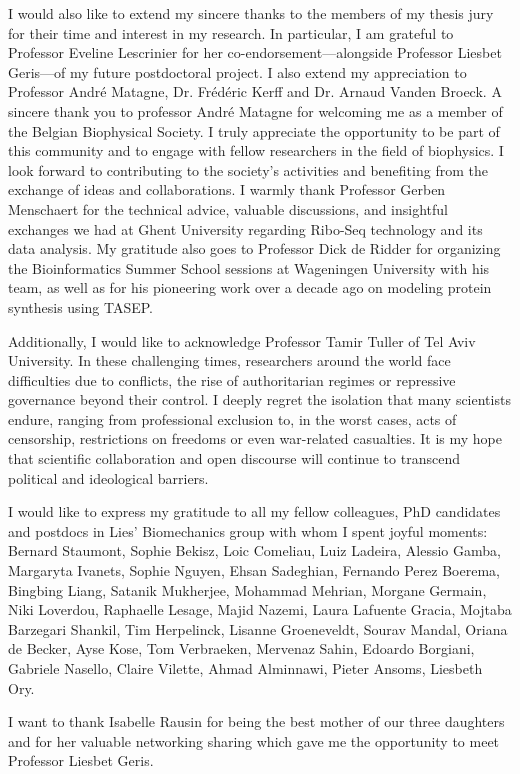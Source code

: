 I would also like to extend my sincere thanks to the members of my thesis jury for their time and interest in my research. In particular, I am grateful to Professor Eveline Lescrinier for her co-endorsement—alongside Professor Liesbet Geris—of my future postdoctoral project. I also extend my appreciation to Professor André Matagne, Dr. Frédéric Kerff and Dr. Arnaud Vanden Broeck. A sincere thank you to professor André Matagne for welcoming me as a member of the Belgian Biophysical Society. I truly appreciate the opportunity to be part of this community and to engage with fellow researchers in the field of biophysics. I look forward to contributing to the society’s activities and benefiting from the exchange of ideas and collaborations.
I warmly thank Professor Gerben Menschaert for the technical advice, valuable discussions, and insightful exchanges we had at Ghent University regarding Ribo-Seq technology and its data analysis. My gratitude also goes to Professor Dick de Ridder for organizing the Bioinformatics Summer School sessions at Wageningen University with his team, as well as for his pioneering work over a decade ago on modeling protein synthesis using TASEP.

Additionally, I would like to acknowledge Professor Tamir Tuller of Tel Aviv University. In these challenging times, researchers around the world face difficulties due to conflicts, the rise of authoritarian regimes or repressive governance beyond their control. I deeply regret the isolation that many scientists endure, ranging from professional exclusion to, in the worst cases, acts of censorship, restrictions on freedoms or even war-related casualties. It is my hope that scientific collaboration and open discourse will continue to transcend political and ideological barriers.

I would like to express my gratitude to all my fellow colleagues, PhD candidates and postdocs in Lies' Biomechanics group with whom I spent joyful moments: Bernard Staumont, Sophie Bekisz, Loic Comeliau, Luiz Ladeira, Alessio Gamba, Margaryta Ivanets, Sophie Nguyen, Ehsan Sadeghian, Fernando Perez Boerema, Bingbing Liang, Satanik Mukherjee, Mohammad Mehrian, Morgane Germain, Niki Loverdou, Raphaelle Lesage, Majid Nazemi, Laura Lafuente Gracia, Mojtaba Barzegari Shankil, Tim Herpelinck, Lisanne Groeneveldt, Sourav Mandal, Oriana de Becker, Ayse Kose, Tom Verbraeken, Mervenaz Sahin, Edoardo Borgiani, Gabriele Nasello, Claire Vilette, Ahmad Alminnawi, Pieter Ansoms, Liesbeth Ory.

I want to thank Isabelle Rausin for being the best mother of our three daughters and for her valuable networking sharing which gave me the opportunity to meet Professor Liesbet Geris.

